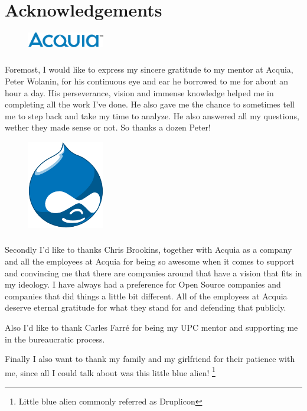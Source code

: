 \chapter{Acknowledgements}
\begin{figure}
\begin{center}
     \includegraphics[width=0.3\textwidth]{images/acquia_067CBB_300px_1.png}
\end{center}
\end{figure}
\paragraph{}
Foremost, I would like to express my sincere gratitude to my mentor at Acquia, Peter Wolanin, for his continuous eye and ear he borrowed to me for about an hour a day. His perseverance, vision and immense knowledge helped me in completing all the work I've done. He also gave me the chance to sometimes tell me to step back and take my time to analyze. He also answered all my questions, wether they made sense or not. So thanks a dozen Peter!

\begin{figure}
\begin{center}
     \includegraphics[width=0.3\textwidth]{images/druplicon.png}
\end{center}
\end{figure}
\paragraph{}
Secondly I'd like to thanks Chris Brookins, together with Acquia as a company and all the employees at Acquia for being so awesome when it comes to support and convincing me that there are companies around that have a vision that fits in my ideology. I have always had a preference for Open Source companies and companies that did things a little bit different. All of the employees at Acquia deserve eternal gratitude for what they stand for and defending that publicly.

Also I'd like to thank Carles Farré for being my UPC mentor and supporting me in the bureaucratic process.

Finally I also want to thank my family and my girlfriend for their patience with me, since all I could talk about was this little blue alien! \footnote{Little blue alien commonly referred as Druplicon}